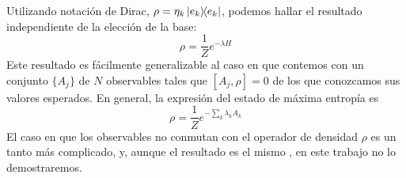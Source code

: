 Utilizando notación de Dirac, $\rho=\eta_{k}\dyad{e_{k}}$, podemos hallar el resultado independiente de la elección de la base:
\begin{equation}
    \rho=\frac{1}{Z}e^{-\lambda H}
\end{equation}
Este resultado es fácilmente generalizable al caso en que contemos con un  conjunto $\{A_{j}\}$ de $N$ observables tales que $[A_{j},\rho]=0$ de los que conozcamos sus valores esperados. En general, la expresión del estado de máxima entropía es
\begin{equation}
    \rho=\frac{1}{Z}e^{-\sum_{k}\lambda_{k} A_{k}}
\end{equation}
El caso en que los observables no conmutan con el operador de densidad $\rho$ es un tanto más complicado, y, aunque el resultado es el mismo \cite{FormalJaynes}, en este trabajo no lo demostraremos.